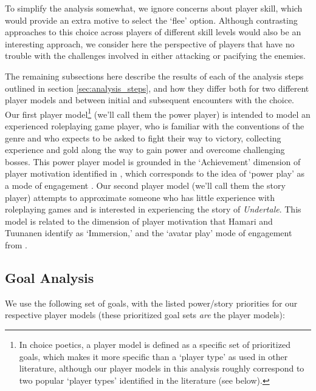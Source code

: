 \documentclass[arts,article,submit,moreauthors,pdftex,10pt,a4paper]{Definitions/mdpi}
\begin{document}
To simplify the analysis somewhat, we ignore concerns about player skill, which would provide an extra motive to select the `flee' option.
%
Although contrasting approaches to this choice across players of different skill levels would also be an interesting approach, we consider here the perspective of players that have no trouble with the challenges involved in either attacking or pacifying the enemies.


The remaining subsections here describe the results of each of the analysis steps outlined in section \ref{sec:analysis_steps}, and how they differ both for two different player models and between initial and subsequent encounters with the choice.
%
Our first player model\footnote{In choice poetics, a player model is defined as a specific set of prioritized goals, which makes it more specific than a `player type' as used in other literature, although our player models in this analysis roughly correspond to two popular `player types' identified in the literature (see below).} (we'll call them the power player) is intended to model an experienced roleplaying game player, who is familiar with the conventions of the genre and who expects to be asked to fight their way to victory, collecting experience and gold along the way to gain power and overcome challenging bosses.
%
This power player model is grounded in the `Achievement' dimension of player motivation identified in \citep{hamari2014player}, which corresponds to the idea of `power play' as a mode of engagement \citep{mawhorter2014towards}.
%
Our second player model (we'll call them the story player) attempts to approximate someone who has little experience with roleplaying games and is interested in experiencing the story of \emph{Undertale}.
%
This model is related to the dimension of player motivation that Hamari and Tuunanen identify as `Immersion,' and the `avatar play' mode of engagement from \citep{mawhorter2014towards}.

\subsection{Goal Analysis}

We use the following set of goals, with the listed power/story priorities for our respective player models (these prioritized goal sets \emph{are} the player models):
\end{document}
